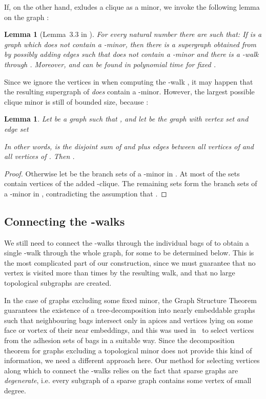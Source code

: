 \documentclass[12pt]{amsart}
\newtheorem{lemma}[theorem]{Lemma}
\begin{document}
If, on the other hand,  exludes a clique  as
a minor, we invoke the following lemma on the graph :
\begin{lemma}[Lemma~3.3 in \cite{ekk13}]
  \label{lem:kwalkexcl}
  For every natural number  there are  such that: If  is a graph which does not contain a -minor, then there
  is a supergraph  obtained from  by possibly adding
  edges such that  does not contain a -minor and there is a
  -walk  through . Moreover,  and  can be found in
  polynomial time for fixed .
\end{lemma}
Since we ignore the vertices in  when computing the
-walk , it may happen that the resulting supergraph of
 \emph{does} contain a -minor. However, the largest
possible clique minor is still of bounded size, because
:
\begin{lemma}
  Let  be a graph such that , and let  be the graph with vertex set  and edge
  set
  
  In other words,  is the disjoint sum of  and 
  plus edges between all vertices of  and all vertices of
  . Then .
\end{lemma}
\begin{proof}
  Otherwise let  be the branch sets of a
  -minor in . At most  of the sets contain
  vertices of the added -clique. The remaining sets form the
  branch sets of a -minor in , contradicting the assumption
  that .
\end{proof}

\subsection{Connecting the -walks}

We still need to connect the -walks through the individual bags of
 to obtain a single -walk through the whole graph,
for some  to be determined below. This is the most complicated
part of our construction, since we must guarantee that no vertex is
visited more than  times by the resulting walk, and that no large
topological subgraphs are created.

In the case of graphs excluding some fixed minor, the Graph Structure
Theorem guarantees the existence of a tree-decomposition into nearly
embeddable graphs such that neighbouring bags intersect only in apices
and vertices lying on some face or vortex of their near embeddings,
and this was used in~\cite{ekk13} to select vertices from the adhesion
sets of bags in a suitable way. Since the decomposition theorem for
graphs excluding a topological minor does not provide this kind of
information, we need a different approach here. Our method for
selecting vertices along which to connect the -walks relies on the
fact that sparse graphs are \emph{degenerate}, i.e. every subgraph of
a sparse graph contains some vertex of small degree.
\end{document}
